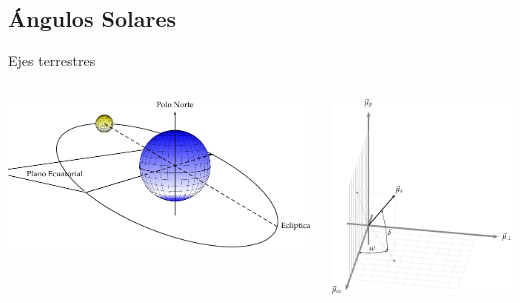 \documentclass[xcolor={usenames,svgnames,dvipsnames}]{beamer}
\begin{document}
\subsection{Ángulos Solares}
\label{sec:org9c115bc}

\begin{frame}[plain,label={sec:org30c98da}]{Ejes terrestres}
\begin{columns}
\begin{column}{0.6\columnwidth}
\begin{center}
\includegraphics[width=.9\linewidth]{../figs/SoldesdeTierra.pdf}
\end{center}
\end{column}

\begin{column}{0.6\columnwidth}
\begin{center}
\includegraphics[width=.9\linewidth]{../figs/SistemaCoordenadasTerrestre-crop.pdf}
\end{center}
\end{column}
\end{columns}


\end{frame}
\end{document}
